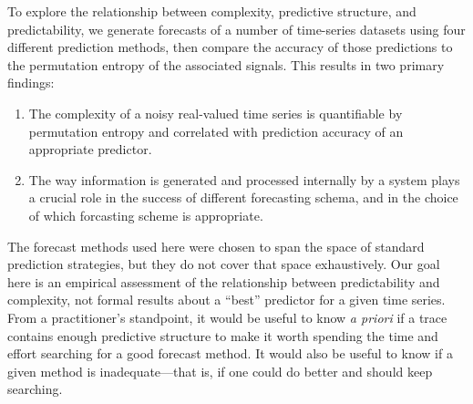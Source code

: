 To explore the relationship between complexity, predictive structure,
and predictability, we generate forecasts of a number of time-series
datasets using four different prediction methods, then compare the
accuracy of those predictions to the permutation entropy of the
associated signals.  This results in two primary findings:
\begin{enumerate}
\item The complexity of a noisy real-valued time series is
  quantifiable by permutation entropy and correlated with prediction
  accuracy of an appropriate predictor.
\item The way information is generated and processed internally by a
  system plays a crucial role in the success of different forecasting
  schema, and in the choice of which forcasting scheme is appropriate.
\end{enumerate}
The forecast methods used here were chosen to span the space of
standard prediction strategies, but they do not cover that space
exhaustively.  Our goal here is an empirical assessment of the
relationship between predictability and complexity, not formal results
about a ``best'' predictor for a given time series.  From a
practitioner's standpoint, it would be useful to know {\sl a priori}
if a trace contains enough predictive structure to make it worth
spending the time and effort searching for a good forecast method.  It
would also be useful to know if a given method is inadequate---that
is, if one could do better and should keep searching.



